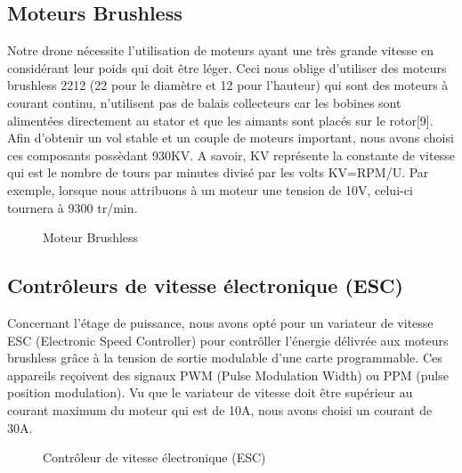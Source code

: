 	\subsection{Moteurs Brushless}
	Notre drone nécessite l'utilisation de moteurs ayant une très grande vitesse en considérant leur poids qui doit être léger. Ceci nous oblige d'utiliser des moteurs brushless 2212 (22 pour le diamètre et 12 pour l'hauteur) qui sont des moteurs à courant continu, n’utilisent pas de balais collecteurs car les bobines sont alimentées directement au stator et que les aimants sont placés sur le rotor[9]. Afin d'obtenir un vol stable et un couple de moteurs important, nous avons choisi ces composants possèdant 930KV. A savoir, KV représente la constante de vitesse qui est le nombre de tours par minutes divisé par les volts KV=RPM/U. Par exemple, lorsque nous attribuons à un moteur une tension de 10V, celui-ci tournera à 9300 tr/min. 
	\begin{figure} [h]
		\begin{center}
			\centering
		\end{center}
		\caption{Moteur Brushless}
	\end{figure}
	\subsection{Contrôleurs de vitesse électronique (ESC)}
	Concernant l'étage de puissance, nous avons opté pour un variateur de vitesse ESC (Electronic Speed Controller) pour contrôller l'énergie délivrée aux moteurs brushless  grâce à la tension de sortie modulable d’une carte programmable.  Ces appareils reçoivent des signaux PWM (Pulse Modulation Width) ou PPM (pulse position modulation). Vu que le variateur de vitesse doit être supérieur au courant maximum du moteur qui est de 10A, nous avons choisi un courant de 30A. 
	\par
	\begin{figure} [h]
		\begin{center}
			\centering
		\end{center}
		\caption{Contrôleur de vitesse électronique (ESC)}
	\end{figure}
	\newpage
